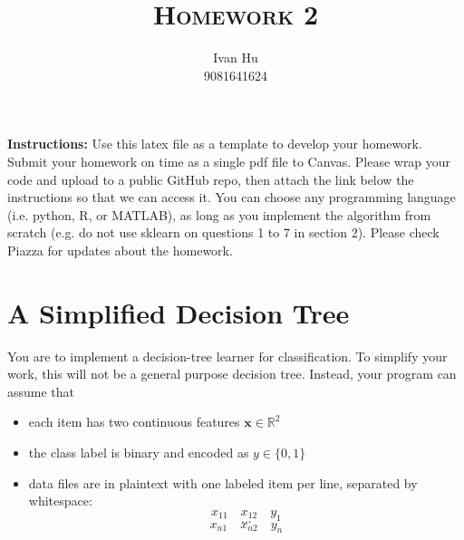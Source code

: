 \documentclass[a4paper]{article}
\title{\textsc{Homework 2}} %
\author{
Ivan Hu \\
9081641624\\
}
\date{}
\theoremstyle{definition}
\newcommand{\RR}{\mathbb{R}}
\def\x{\mathbf x}
\begin{document}
\maketitle


\textbf{Instructions:}
Use this latex file as a template to develop your homework. Submit your homework on time as a single pdf file to Canvas. Please wrap your code and upload to a public GitHub repo, then attach the link below the instructions so that we can access it. You can choose any programming language (i.e. python, R, or MATLAB), as long as you implement the algorithm from scratch (e.g. do not use sklearn on questions 1 to 7 in section 2). Please check Piazza for updates about the homework.

\section{A Simplified Decision Tree}
You are to implement a decision-tree learner for classification.
To simplify your work, this will not be a general purpose decision tree.  Instead, your program can assume that
\begin{itemize}
\item each item has two continuous features $\x \in \RR^2$
\item the class label is binary and encoded as $y \in \{0,1\}$
\item data files are in plaintext with one labeled item per line, separated by whitespace:
$$x_{11} \quad x_{12} \quad y_1$$
$$...$$
$$x_{n1} \quad x_{n2} \quad y_n$$
\end{itemize}
\end{document}
